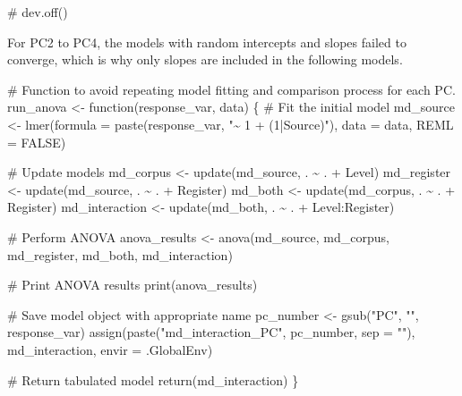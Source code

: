 \documentclass[
  letterpaper,
  DIV=11,
  numbers=noendperiod]{scrreprt}
\newenvironment{Shaded}{\begin{snugshade}}{\end{snugshade}}
\newcommand{\AttributeTok}[1]{\textcolor[rgb]{0.40,0.45,0.13}{#1}}
\newcommand{\CommentTok}[1]{\textcolor[rgb]{0.37,0.37,0.37}{#1}}
\newcommand{\ConstantTok}[1]{\textcolor[rgb]{0.56,0.35,0.01}{#1}}
\newcommand{\ControlFlowTok}[1]{\textcolor[rgb]{0.00,0.23,0.31}{#1}}
\newcommand{\FunctionTok}[1]{\textcolor[rgb]{0.28,0.35,0.67}{#1}}
\newcommand{\NormalTok}[1]{\textcolor[rgb]{0.00,0.23,0.31}{#1}}
\newcommand{\OtherTok}[1]{\textcolor[rgb]{0.00,0.23,0.31}{#1}}
\newcommand{\SpecialCharTok}[1]{\textcolor[rgb]{0.37,0.37,0.37}{#1}}
\newcommand{\StringTok}[1]{\textcolor[rgb]{0.13,0.47,0.30}{#1}}
\begin{document}
\begin{Shaded}
\begin{Highlighting}[]
\CommentTok{\# dev.off()}
\end{Highlighting}
\end{Shaded}

For PC2 to PC4, the models with random intercepts and slopes failed to
converge, which is why only slopes are included in the following models.

\begin{Shaded}
\begin{Highlighting}[]
\CommentTok{\# Function to avoid repeating model fitting and comparison process for each PC.}
\NormalTok{run\_anova }\OtherTok{\textless{}{-}} \ControlFlowTok{function}\NormalTok{(response\_var, data) \{}
  \CommentTok{\# Fit the initial model}
\NormalTok{  md\_source }\OtherTok{\textless{}{-}} \FunctionTok{lmer}\NormalTok{(}\AttributeTok{formula =} \FunctionTok{paste}\NormalTok{(response\_var, }\StringTok{"\textasciitilde{} 1 + (1|Source)"}\NormalTok{), }\AttributeTok{data =}\NormalTok{ data, }\AttributeTok{REML =} \ConstantTok{FALSE}\NormalTok{)}
  
  \CommentTok{\# Update models}
\NormalTok{  md\_corpus }\OtherTok{\textless{}{-}} \FunctionTok{update}\NormalTok{(md\_source, . }\SpecialCharTok{\textasciitilde{}}\NormalTok{ . }\SpecialCharTok{+}\NormalTok{ Level)}
\NormalTok{  md\_register }\OtherTok{\textless{}{-}} \FunctionTok{update}\NormalTok{(md\_source, . }\SpecialCharTok{\textasciitilde{}}\NormalTok{ . }\SpecialCharTok{+}\NormalTok{ Register)}
\NormalTok{  md\_both }\OtherTok{\textless{}{-}} \FunctionTok{update}\NormalTok{(md\_corpus, . }\SpecialCharTok{\textasciitilde{}}\NormalTok{ . }\SpecialCharTok{+}\NormalTok{ Register)}
\NormalTok{  md\_interaction }\OtherTok{\textless{}{-}} \FunctionTok{update}\NormalTok{(md\_both, . }\SpecialCharTok{\textasciitilde{}}\NormalTok{ . }\SpecialCharTok{+}\NormalTok{ Level}\SpecialCharTok{:}\NormalTok{Register)}
  
  \CommentTok{\# Perform ANOVA}
\NormalTok{  anova\_results }\OtherTok{\textless{}{-}} \FunctionTok{anova}\NormalTok{(md\_source, md\_corpus, md\_register, md\_both, md\_interaction)}
  
  \CommentTok{\# Print ANOVA results}
  \FunctionTok{print}\NormalTok{(anova\_results)}
  
  \CommentTok{\# Save model object with appropriate name}
\NormalTok{  pc\_number }\OtherTok{\textless{}{-}} \FunctionTok{gsub}\NormalTok{(}\StringTok{"PC"}\NormalTok{, }\StringTok{""}\NormalTok{, response\_var)}
  \FunctionTok{assign}\NormalTok{(}\FunctionTok{paste}\NormalTok{(}\StringTok{"md\_interaction\_PC"}\NormalTok{, pc\_number, }\AttributeTok{sep =} \StringTok{""}\NormalTok{), md\_interaction, }\AttributeTok{envir =}\NormalTok{ .GlobalEnv)}
  
  \CommentTok{\# Return tabulated model}
  \FunctionTok{return}\NormalTok{(md\_interaction)}
\NormalTok{\}}
\end{Highlighting}
\end{Shaded}
\end{document}
